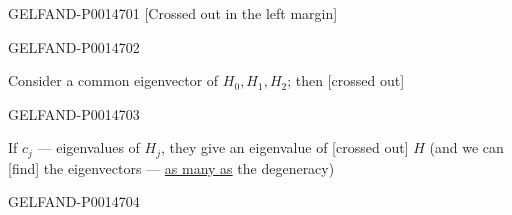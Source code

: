 \begin{GelfandAdjacentEvidence}{GELFAND-P001470}{1}
[Crossed out in the left margin]
\end{GelfandAdjacentEvidence}
\begin{GelfandAdjacentEvidence}{GELFAND-P001470}{2}


Consider a common eigenvector of \(H_0,H_1,H_2\); then [crossed out]
\end{GelfandAdjacentEvidence}
\begin{GelfandAdjacentEvidence}{GELFAND-P001470}{3}


If \(c_j\) --- eigenvalues of \(H_j\), they give an eigenvalue of [crossed out] \(H\)
(and we can [find] the eigenvectors --- \uline{as many as} the degeneracy)
\end{GelfandAdjacentEvidence}
\begin{GelfandAdjacentEvidence}{GELFAND-P001470}{4}

\end{GelfandAdjacentEvidence}
